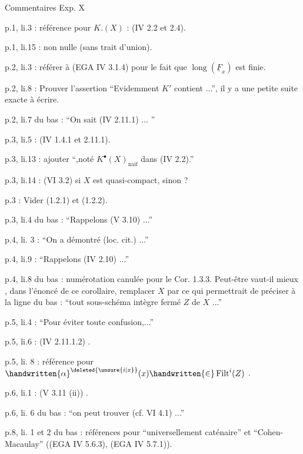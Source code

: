 \begin{center}Commentaires Exp. X\end{center}

p.1, li.3 : référence pour $K.(X)$ : (IV 2.2 et 2.4).

p.1, li.15 : non nulle (sans trait d'union).

p.2, li.3 : référer à (EGA IV 3.1.4) pour le fait que $\operatorname{long}(\underline{F}_x)$ est finie.

p.2, li.8 : Prouver l'assertion ``Evidemment $K'$ contient ...'', il y a une petite suite exacte à écrire.

p.2, li.7 du bas : ``On sait (IV 2.11.1) ... ''

p.3, li.5 : (IV 1.4.1 et 2.11.1).


p.3, li.13 :  ajouter ``,noté $K^{\bullet}(X)_{\text{naïf}}$ dans (IV 2.2).''

p.3, li.14 :  (VI 3.2) si $X$ est quasi-compact, sinon ?

p.3 : Vider (1.2.1) et (1.2.2).

p.3, li.4 du bas : ``Rappelons (V 3.10) ...''

p.4, li. 3 : ``On a démontré (loc. cit.) ...''

p.4, li.9 : ``Rappelons (IV 2.10) ...''

p.4, li.8 du bas : numérotation canulée pour le Cor. 1.3.3. Peut-être vaut-il mieux , dans l'énoncé de ce corollaire, remplacer $X$ par  ce qui permettrait de préciser à la ligne du bas : ``tout sous-schéma intègre fermé $Z$ de $X$ ...''

p.5, li.4 : ``Pour  éviter toute confusion,...''

p.5, li.6 : (IV 2.11.1.2) .

p.5, li. 8 : référence  pour $\handwritten{\alpha}^{\deleted{\unsure{i|x}}}(x)\handwritten{\in}\operatorname{Filt}^{i}(Z)$ .

p.6, li.1 : (V 3.11 (ii)) .

p.6, li. 6 du bas : ``on peut trouver (cf. VI 4.1) ...''

p.8, li. 1 et 2 du bas : références pour ``universellement caténaire'' et ``Cohen-Macaulay'' ((EGA IV 5.6.3), (EGA IV 5.7.1)). 

